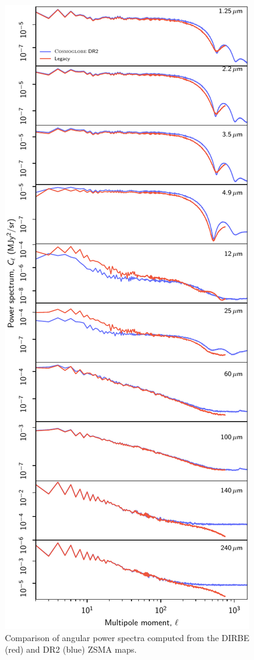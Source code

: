 \documentclass{aa}
\begin{document}
\begin{figure}
	\centering
	\includegraphics[width=\columnwidth]{figs/cls_DR2_vs_DIRBE_v2.pdf}
	\caption{Comparison of angular power spectra computed from the DIRBE (red) and DR2 (blue) ZSMA maps.}
	\label{fig:powspec}
\end{figure}
\end{document}
